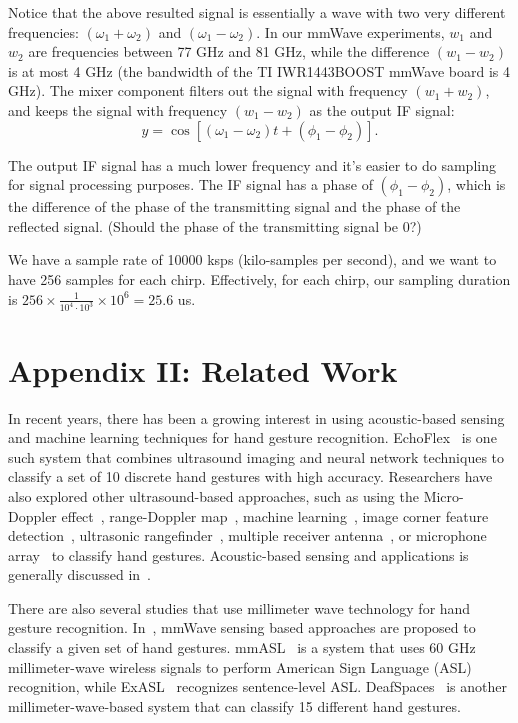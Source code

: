 \documentclass[11pt, oneside]{article}   	%
\begin{document}
Notice that the above resulted signal is essentially a wave with two very different frequencies: $(\omega_1 + \omega_2)$ and $(\omega_1 - \omega_2)$. In our mmWave experiments, $w_1$ and $w_2$ are frequencies between 77 GHz and 81 GHz, while the difference $(w_1 - w_2)$ is at most 4 GHz (the bandwidth of the TI IWR1443BOOST mmWave board is 4 GHz). The mixer component filters out the signal with frequency $(w_1 + w_2)$, and keeps the signal with frequency  $(w_1 - w_2)$ as the output IF signal:
$$y = \cos\left[(\omega_1 - \omega_2) t + (\phi_1 - \phi_2)\right].$$

The output IF signal has a much lower frequency and it's easier to do sampling for signal processing purposes. The IF signal has a phase of $(\phi_1 - \phi_2)$, which is the difference of the phase of the transmitting signal and the phase of the reflected signal. (Should the phase of the transmitting signal be 0?)

We have a sample rate of 10000 ksps (kilo-samples per second), and we want to have 256 samples for each chirp. Effectively, for each chirp, our sampling duration is $256\times\frac{1}{10^4\cdot 10^3}\times 10^6 = 25.6$ us. 



\section{Appendix II: Related Work}
\label{sec:app:related}

In recent years, there has been a growing interest in using acoustic-based sensing and machine learning techniques for hand gesture recognition. EchoFlex~\cite{ref:echoflex17} is one such system that combines ultrasound imaging and neural network techniques to classify a set of 10 discrete hand gestures with high accuracy. Researchers have also explored other ultrasound-based approaches, such as using the Micro-Doppler effect~\cite{ref:usgr19}, range-Doppler map~\cite{ref:hgr22}, machine learning~\cite{ref:mhgr18}, image corner feature detection~\cite{ref:usgdr21}, ultrasonic rangefinder~\cite{ref:ss12}, multiple receiver antenna~\cite{ref:usgr18}, or microphone array~\cite{ref:usgr17} to classify hand gestures.  Acoustic-based sensing and applications is generally discussed in~\cite{ref:absa20}. 

There are also several studies that use millimeter wave technology for hand gesture recognition. In~\cite{ref:hgrmmv21, ref:slgrmmw22}, mmWave sensing based approaches are proposed to classify a given set of hand gestures. mmASL~\cite{ref:mmasl} is a system that uses 60 GHz millimeter-wave wireless signals to perform American Sign Language (ASL) recognition, while ExASL~\cite{ref:exasl20} recognizes sentence-level ASL. DeafSpaces~\cite{ref:deafspaces21} is another millimeter-wave-based system that can classify 15 different hand gestures. 
\end{document}
